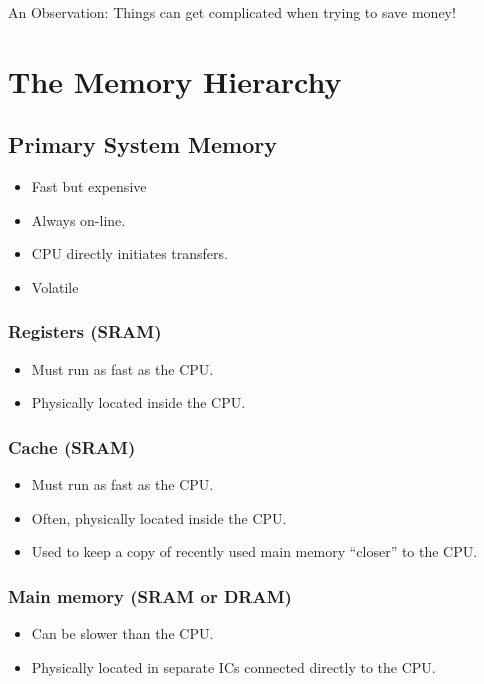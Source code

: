 \documentclass[10pt]{article}
\begin{document}
An Observation: Things can get complicated when trying to save money!

\section{The Memory Hierarchy}

\subsection{Primary System Memory}
\begin{itemize}
\item Fast but expensive
\item Always on-line.  
\item CPU directly initiates transfers. 
\item Volatile
\end{itemize}

\subsubsection{Registers (SRAM)}
\begin{itemize}
\item Must run as fast as the CPU.
\item Physically located inside the CPU.
\end{itemize}

\subsubsection{Cache (SRAM)}
\begin{itemize}
\item Must run as fast as the CPU.
\item Often, physically located inside the CPU.
\item Used to keep a copy of recently used main memory ``closer'' to the CPU.
\end{itemize}

\subsubsection{Main memory (SRAM or DRAM)}
\begin{itemize}
\item Can be slower than the CPU.
\item Physically located in separate ICs connected directly to the CPU.
\end{itemize}
\end{document}
